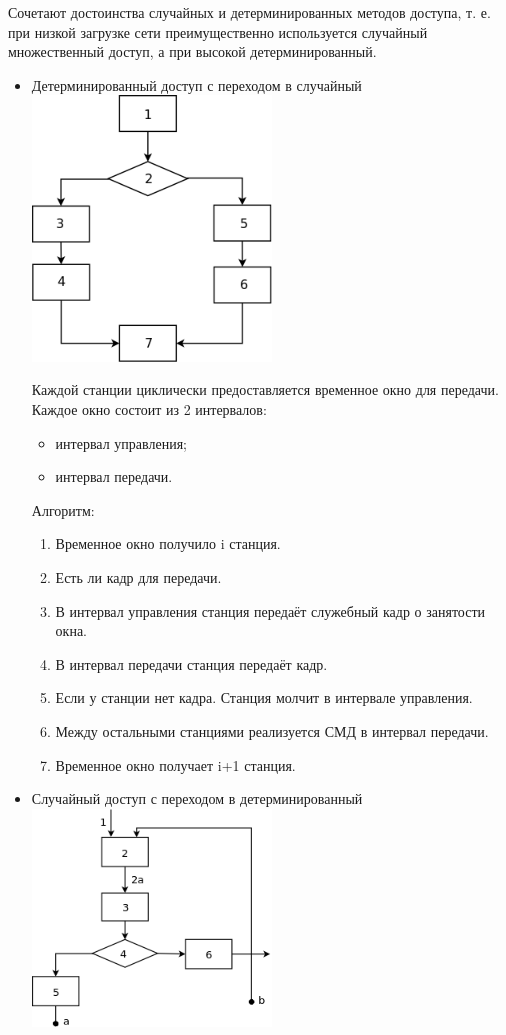 \documentclass[12pt, russian, oneside, article]{ncc}
\begin{document}
Сочетают достоинства случайных и детерминированных методов доступа, т. е. при низкой загрузке сети преимущественно используется случайный множественный доступ, а при высокой детерминированный.
\begin{itemize}

\item Детерминированный доступ с переходом в случайный\\
\label{sec-5_1_3_1}%
\includegraphics[width=0.5\textwidth]{images/SiSPI/ds.png}

Каждой станции циклически предоставляется временное окно для передачи. Каждое окно состоит из 2 интервалов:
\begin{itemize}
\item интервал управления;
\item интервал передачи.
\end{itemize}

Алгоритм:
\begin{enumerate}
\item Временное окно получило i станция.
\item Есть ли кадр для передачи.
\item В интервал управления станция передаёт служебный кадр о занятости окна.
\item В интервал передачи станция передаёт кадр.
\item Если у станции нет кадра. Станция молчит в интервале управления.
\item Между остальными станциями реализуется СМД в интервал передачи.
\item Временное окно получает i+1 станция.
\end{enumerate}


\item Случайный доступ с переходом в детерминированный\\
\label{sec-5_1_3_2}%
\includegraphics[width=0.5\textwidth]{images/SiSPI/mdopks.png}


\end{itemize}
\end{document}
